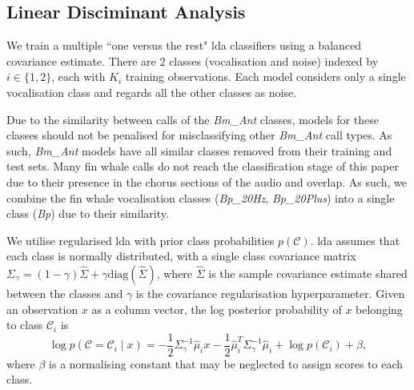 {%



\subsection{Linear Disciminant Analysis}
We train a multiple ``one versus the rest" \ac{lda} classifiers using a balanced covariance estimate. There are 2 classes (vocalisation and noise) indexed by $i \in \{1, 2\}$, each with $K_i$ training observations. Each model considers only a single vocalisation class and regards all the other classes as noise.  

Due to the similarity between calls of the \textit{Bm\_Ant} classes, models for these classes should not be penalised for misclassifying other \textit{Bm\_Ant} call types. As such, \textit{Bm\_Ant} models have all similar classes removed from their training and test sets. Many fin whale calls do not reach the classification stage of this paper due to their presence in the chorus sections of the audio and overlap. As such, we combine the fin whale vocalisation classes (\textit{Bp\_20Hz}, \textit{Bp\_20Plus}) into a single class (\textit{Bp}) due to their similarity.

We utilise regularised \ac{lda} with prior class probabilities $p(\mathcal{C})$. \ac{lda} assumes that each class is normally distributed, with a single class covariance matrix $\Sigma_\gamma = (1-\gamma)\hat{\Sigma} + \gamma \text{diag}\left(\hat{\Sigma}\right)$, where $\hat{\Sigma}$ is the sample covariance estimate shared between the classes and $\gamma$ is the covariance regularisation hyperparameter. Given an observation $x$ as a column vector, the log posterior probability of $x$ belonging to class $\mathcal{C}_i$ is
\begin{equation}
    \log p\left(\mathcal{C} = \mathcal{C}_i \middle| x\right) = -\frac{1}{2}\Sigma_\gamma^{-1}\hat{\mu}_i x -\frac{1}{2} \hat{\mu}_i^T\Sigma_\gamma^{-1}\hat{\mu}_i + \log p(\mathcal{C}_i) + \beta,
\end{equation}
where $\beta$ is a normalising constant that may be neglected to assign scores to each class.

}
